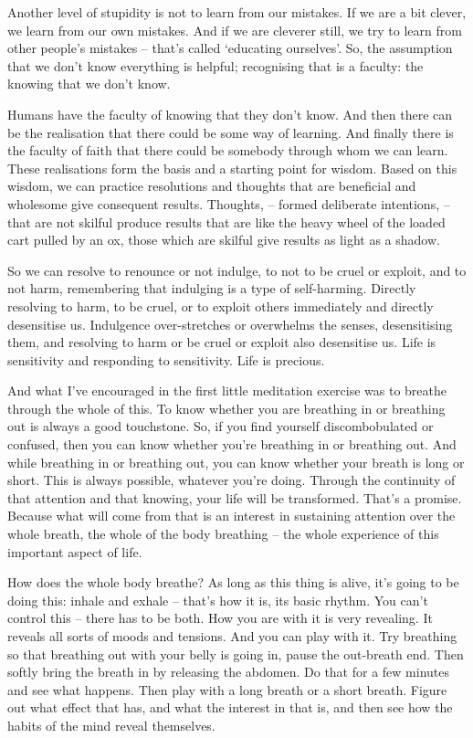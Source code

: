 Another level of stupidity is not to learn from our mistakes. If we are a bit
clever, we learn from our own mistakes. And if we are cleverer still, we try to
learn from other people's mistakes -- that's called `educating ourselves'. So,
the assumption that we don't know everything is helpful; recognising that is a
faculty: the knowing that we don't know.

Humans have the faculty of knowing that they don't know. And then there can be
the realisation that there could be some way of learning. And 
finally there is the faculty of faith that there could be somebody through whom we can learn. These realisations form the
basis and a starting point for wisdom. Based on this wisdom, we can practice resolutions and thoughts
that are beneficial and wholesome give consequent results. Thoughts, -- formed
deliberate intentions, -- that are not skilful produce results that are like the heavy
wheel of the loaded cart pulled by an ox, those which are skilful give results as light as a
shadow.

So we can resolve to renounce or not indulge, to not to be cruel or
exploit, and to not harm, remembering that indulging is a type of self-harming.
Directly resolving to harm, to be cruel, or to exploit others immediately and directly desensitise us.
Indulgence over-stretches or overwhelms the senses, desensitising them, and
resolving to harm or be cruel or exploit also desensitise us. Life is
sensitivity and responding to sensitivity. Life is precious.

And what I've encouraged in the first little meditation exercise was to
breathe through the whole of this. To know whether you are breathing in or
breathing out is always a good touchstone. So, if you find yourself
discombobulated or confused, then you can know whether you're breathing in or
breathing out. And while breathing in or breathing out, you can know whether
your breath is long or short. This is always possible, whatever you're doing.
Through the continuity of that attention and that knowing, your life will be
transformed. That's a promise. Because what will come from that is an interest
in sustaining attention over the whole breath, the whole of the body breathing
-- the whole experience of this important aspect of life.

How does the whole body breathe? As long as this thing is alive, it's going to
be doing this: inhale and exhale -- that's how it is, its basic rhythm. You
can't control this -- there has to be both. How you are with it is very
revealing. It reveals all sorts of moods and tensions. And you can play with it.
Try breathing so that breathing out with your belly is going in, pause the out-breath end. Then
softly bring the breath in by releasing the abdomen. Do that for a
few minutes and see what happens. Then play with a long breath or a short
breath. Figure out what effect that has, and what the interest in that is, and
then see how the habits of the mind reveal themselves.

